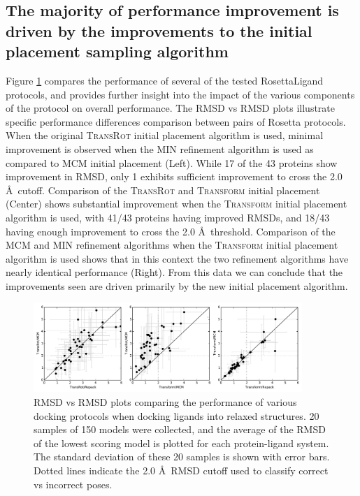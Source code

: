 \subsection{The majority of performance improvement is driven by the improvements to the initial placement sampling algorithm}
Figure \ref{fig:rmsd_vs_rmsd} compares the performance of several of the tested RosettaLigand protocols, and provides further insight into the impact of the various components of the protocol on overall performance.
The RMSD vs RMSD plots illustrate specific performance differences comparison between pairs of Rosetta protocols.
When the original \textsc{TransRot} initial placement algorithm is used, minimal improvement is observed when the MIN refinement algorithm is used as compared to MCM initial placement (Left).
While 17 of the 43 proteins show improvement in RMSD, only 1 exhibits sufficient improvement to cross the 2.0 \AA\ cutoff.
Comparison of the \textsc{TransRot} and \textsc{Transform} initial placement (Center) shows substantial improvement when the \textsc{Transform} initial placement algorithm is used, with 41/43 proteins having improved RMSDs, and 18/43 having enough improvement to cross the 2.0 \AA\ threshold.
Comparison of the MCM and MIN refinement algorithms when the \textsc{Transform} initial placement algorithm is used shows that in this context the two refinement algorithms have nearly identical performance (Right).
From this data we can conclude that the improvements seen are driven primarily by the new initial placement algorithm. 

\begin{figure}
\centering
\includegraphics[width=4in]{figures/lowres/rmsd_vs_rmsd_relax.pdf}
\caption{
RMSD vs RMSD plots comparing the performance of various docking protocols when docking ligands into relaxed structures.
20 samples of 150 models were collected, and the average of the RMSD of the lowest scoring model is plotted for each protein-ligand system.
The standard deviation of these 20 samples is shown with error bars. Dotted lines indicate the 2.0 \AA\ RMSD cutoff used to classify correct vs incorrect poses. 
}
\label{fig:rmsd_vs_rmsd}
\end{figure}

